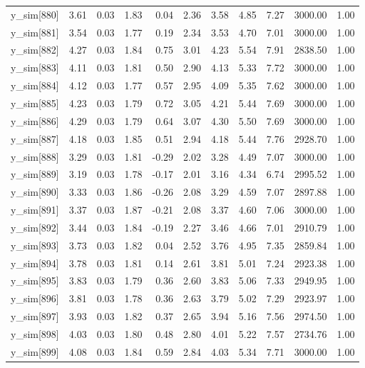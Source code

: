 \begin{table}[ht]
\begin{tabular}{rrrrrrrrrrr}
  y\_sim[880] & 3.61 & 0.03 & 1.83 & 0.04 & 2.36 & 3.58 & 4.85 & 7.27 & 3000.00 & 1.00 \\ 
  y\_sim[881] & 3.54 & 0.03 & 1.77 & 0.19 & 2.34 & 3.53 & 4.70 & 7.01 & 3000.00 & 1.00 \\ 
  y\_sim[882] & 4.27 & 0.03 & 1.84 & 0.75 & 3.01 & 4.23 & 5.54 & 7.91 & 2838.50 & 1.00 \\ 
  y\_sim[883] & 4.11 & 0.03 & 1.81 & 0.50 & 2.90 & 4.13 & 5.33 & 7.72 & 3000.00 & 1.00 \\ 
  y\_sim[884] & 4.12 & 0.03 & 1.77 & 0.57 & 2.95 & 4.09 & 5.35 & 7.62 & 3000.00 & 1.00 \\ 
  y\_sim[885] & 4.23 & 0.03 & 1.79 & 0.72 & 3.05 & 4.21 & 5.44 & 7.69 & 3000.00 & 1.00 \\ 
  y\_sim[886] & 4.29 & 0.03 & 1.79 & 0.64 & 3.07 & 4.30 & 5.50 & 7.69 & 3000.00 & 1.00 \\ 
  y\_sim[887] & 4.18 & 0.03 & 1.85 & 0.51 & 2.94 & 4.18 & 5.44 & 7.76 & 2928.70 & 1.00 \\ 
  y\_sim[888] & 3.29 & 0.03 & 1.81 & -0.29 & 2.02 & 3.28 & 4.49 & 7.07 & 3000.00 & 1.00 \\ 
  y\_sim[889] & 3.19 & 0.03 & 1.78 & -0.17 & 2.01 & 3.16 & 4.34 & 6.74 & 2995.52 & 1.00 \\ 
  y\_sim[890] & 3.33 & 0.03 & 1.86 & -0.26 & 2.08 & 3.29 & 4.59 & 7.07 & 2897.88 & 1.00 \\ 
  y\_sim[891] & 3.37 & 0.03 & 1.87 & -0.21 & 2.08 & 3.37 & 4.60 & 7.06 & 3000.00 & 1.00 \\ 
  y\_sim[892] & 3.44 & 0.03 & 1.84 & -0.19 & 2.27 & 3.46 & 4.66 & 7.01 & 2910.79 & 1.00 \\ 
  y\_sim[893] & 3.73 & 0.03 & 1.82 & 0.04 & 2.52 & 3.76 & 4.95 & 7.35 & 2859.84 & 1.00 \\ 
  y\_sim[894] & 3.78 & 0.03 & 1.81 & 0.14 & 2.61 & 3.81 & 5.01 & 7.24 & 2923.38 & 1.00 \\ 
  y\_sim[895] & 3.83 & 0.03 & 1.79 & 0.36 & 2.60 & 3.83 & 5.06 & 7.33 & 2949.95 & 1.00 \\ 
  y\_sim[896] & 3.81 & 0.03 & 1.78 & 0.36 & 2.63 & 3.79 & 5.02 & 7.29 & 2923.97 & 1.00 \\ 
  y\_sim[897] & 3.93 & 0.03 & 1.82 & 0.37 & 2.65 & 3.94 & 5.16 & 7.56 & 2974.50 & 1.00 \\ 
  y\_sim[898] & 4.03 & 0.03 & 1.80 & 0.48 & 2.80 & 4.01 & 5.22 & 7.57 & 2734.76 & 1.00 \\ 
  y\_sim[899] & 4.08 & 0.03 & 1.84 & 0.59 & 2.84 & 4.03 & 5.34 & 7.71 & 3000.00 & 1.00 \\ 

\end{tabular}
\end{table}
